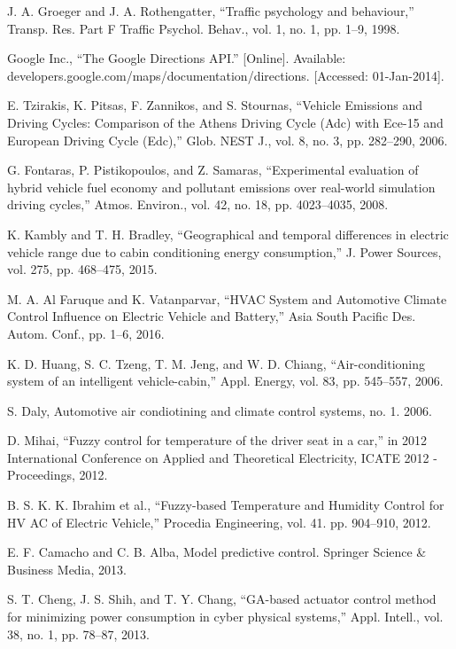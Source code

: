 J. A. Groeger and J. A. Rothengatter, ``Traffic psychology and behaviour,'' Transp. Res. Part F Traffic Psychol. Behav., vol. 1, no. 1, pp. 1–9, 1998.

Google Inc., ``The Google Directions API.'' [Online]. Available: developers.google.com/maps/documentation/directions. [Accessed: 01-Jan-2014].

E. Tzirakis, K. Pitsas, F. Zannikos, and S. Stournas, ``Vehicle Emissions and Driving Cycles: Comparison of the Athens Driving Cycle (Adc) with Ece-15 and European Driving Cycle (Edc),'' Glob. NEST J., vol. 8, no. 3, pp. 282–290, 2006.

G. Fontaras, P. Pistikopoulos, and Z. Samaras, ``Experimental evaluation of hybrid vehicle fuel economy and pollutant emissions over real-world simulation driving cycles,'' Atmos. Environ., vol. 42, no. 18, pp. 4023–4035, 2008.

K. Kambly and T. H. Bradley, ``Geographical and temporal differences in electric vehicle range due to cabin conditioning energy consumption,'' J. Power Sources, vol. 275, pp. 468–475, 2015.

M. A. Al Faruque and K. Vatanparvar, ``HVAC System and Automotive Climate Control Influence on Electric Vehicle and Battery,'' Asia South Pacific Des. Autom. Conf., pp. 1–6, 2016.

K. D. Huang, S. C. Tzeng, T. M. Jeng, and W. D. Chiang, ``Air-conditioning system of an intelligent vehicle-cabin,'' Appl. Energy, vol. 83, pp. 545–557, 2006.

S. Daly, Automotive air condiotining and climate control systems, no. 1. 2006.

	D. Mihai, ``Fuzzy control for temperature of the driver seat in a car,'' in 2012 International Conference on Applied and Theoretical Electricity, ICATE 2012 - Proceedings, 2012.

	B. S. K. K. Ibrahim et al., ``Fuzzy-based Temperature and Humidity Control for HV AC of Electric Vehicle,'' Procedia Engineering, vol. 41. pp. 904–910, 2012.

	E. F. Camacho and C. B. Alba, Model predictive control. Springer Science \& Business Media, 2013.

	S. T. Cheng, J. S. Shih, and T. Y. Chang, ``GA-based actuator control method for minimizing power consumption in cyber physical systems,'' Appl. Intell., vol. 38, no. 1, pp. 78–87, 2013.

